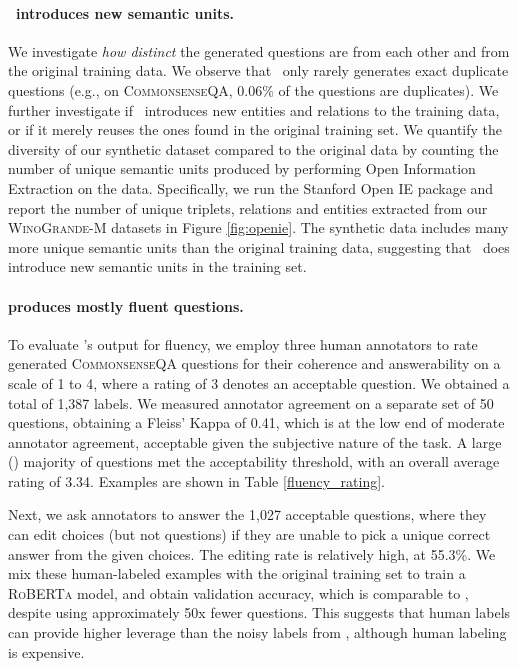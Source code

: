 \documentclass[11pt,a4paper]{article}
\newcommand{\gdaug}{}
\newcommand{\winogrande}{\textsc{WinoGrande}\xspace}
\newcommand{\comqa}{\textsc{CommonsenseQA}\xspace}
\newcommand{\roberta}{\textsc{RoBERTa}\xspace}
\begin{document}
\paragraph{\gdaug\ introduces new semantic units.}
We investigate {\em how distinct} the generated questions are from each other and from the original training data.
We observe that \gdaug\ only rarely
generates exact duplicate questions  (e.g., on \comqa, 0.06\% of the questions are duplicates).
We further investigate if \gdaug\ introduces new entities and relations to the training data, or if it merely reuses the ones found in the original training set.  
We quantify the diversity of our synthetic dataset compared to the original data by counting the number of unique semantic units produced by performing Open Information Extraction \cite{banko2007} on the data. Specifically, we run the Stanford Open IE package \cite{Angeli2015LeveragingLS} and report the number of unique triplets, relations and entities extracted from our \winogrande-M datasets in Figure \ref{fig:openie}.  
The synthetic data includes many more unique semantic units than the original training data, suggesting that \gdaug\ does introduce new semantic units in the training set.  







\paragraph{\gdaug produces mostly fluent questions.} 
To evaluate \gdaug 's output for fluency, we employ three human annotators to rate generated \comqa questions for their coherence and answerability on a scale of 1 to 4, where a rating of 3 denotes an acceptable question.
We obtained a total of 1,387 labels.  
We measured annotator agreement on a separate set of 50 questions, obtaining a Fleiss' Kappa of 0.41, which is at the low end of moderate annotator agreement, acceptable given the subjective nature of the task. 
A large () majority of questions met the acceptability threshold, with an overall average rating of 3.34.
Examples are shown in Table \ref{fluency_rating}. 

Next, we ask annotators to answer the 1,027 acceptable questions, where they can edit choices (but not questions) if they are unable to pick a unique correct answer from the given choices. 
The editing rate is relatively high, at 55.3\%. We mix these human-labeled examples with the original training set to train a \roberta model, and obtain  validation accuracy, which is comparable to \gdaug, despite using approximately 50x fewer questions. 
This suggests that human labels can provide higher leverage than the noisy labels from \gdaug, although human labeling is expensive.
\end{document}
